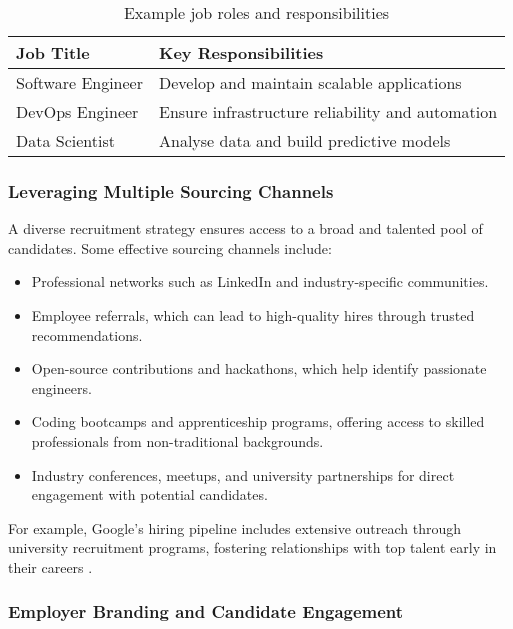 \begin{table}[h]
    \centering
    \begin{tabular}{|l|l|}
        \hline
        \textbf{Job Title} & \textbf{Key Responsibilities}                    \\
        \hline
        Software Engineer  & Develop and maintain scalable applications       \\
        \hline
        DevOps Engineer    & Ensure infrastructure reliability and automation \\
        \hline
        Data Scientist     & Analyse data and build predictive models         \\
        \hline
    \end{tabular}
    \caption{Example job roles and responsibilities}
    \label{tab:jobroles}
\end{table}

\subsubsection{Leveraging Multiple Sourcing Channels}

A diverse recruitment strategy ensures access to a broad and talented pool of candidates. Some effective sourcing channels include:

\begin{itemize}
    \item Professional networks such as LinkedIn and industry-specific communities.
    \item Employee referrals, which can lead to high-quality hires through trusted recommendations.
    \item Open-source contributions and hackathons, which help identify passionate engineers.
    \item Coding bootcamps and apprenticeship programs, offering access to skilled professionals from non-traditional backgrounds.
    \item Industry conferences, meetups, and university partnerships for direct engagement with potential candidates.
\end{itemize}

For example, Google’s hiring pipeline includes extensive outreach through university recruitment programs, fostering relationships with top talent early in their careers \cite{GoogleHiring}.

\subsubsection{Employer Branding and Candidate Engagement}


